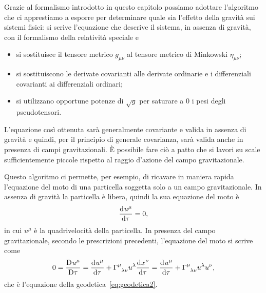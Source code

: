 Grazie al formalismo introdotto in questo capitolo possiamo adottare l'algoritmo
che ci apprestiamo a esporre per determinare quale sia l'effetto della gravità
sui sistemi fisici: si scrive l'equazione che descrive il sistema, in assenza di
gravità, con il formalismo della relatività speciale e
\begin{itemize}
\item si sostituisce il tensore metrico $g_{\mu\nu}$ al
  tensore metrico di Minkowski
  $\eta_{\mu\nu}$;
\item si sostituiscono le derivate covarianti alle
  derivate ordinarie e i differenziali
  covarianti ai differenziali ordinari;
\item si utilizzano opportune potenze di $\sqrt{g}$ per saturare a $0$ i pesi
  degli pseudotensori.
\end{itemize}
L'equazione così ottenuta sarà generalmente covariante e valida in assenza di
gravità e quindi, per il principio di
generale covarianza, sarà valida anche in presenza di campi gravitazionali.  È
possibile fare ciò a patto che si lavori su scale sufficientemente piccole
rispetto al raggio d'azione del campo gravitazionale.

Questo algoritmo ci permette, per esempio, di ricavare in maniera rapida
l'equazione del moto di una particella soggetta solo a un campo gravitazionale.
In assenza di gravità la particella è libera, quindi la sua equazione del moto è
\begin{equation}
  \frac{{\mathop{}\!\mathrm{d}^{}}u^{\mu}}{\mathop{}\!\mathrm{d} {\tau}^{}} = 0,
\end{equation}
in cui $u^{\mu}$ è la quadrivelocità della particella.  In
presenza del campo gravitazionale, secondo le prescrizioni precedenti,
l'equazione del moto si scrive come
\begin{equation}
  0 = \curder{u^{\mu}} = \toder{u^{\mu}}{\tau} +
  \tensor{\Gamma}{^{\mu}_{\lambda\nu}} u^{\lambda} \toder{x^{\nu}}{\tau} =
  \toder{u^{\mu}}{\tau} + \tensor{\Gamma}{^{\mu}_{\lambda\nu}} u^{\lambda}
  u^{\nu},
\end{equation}
che è l'equazione della
geodetica~\eqref{eq:geodetica2}.


